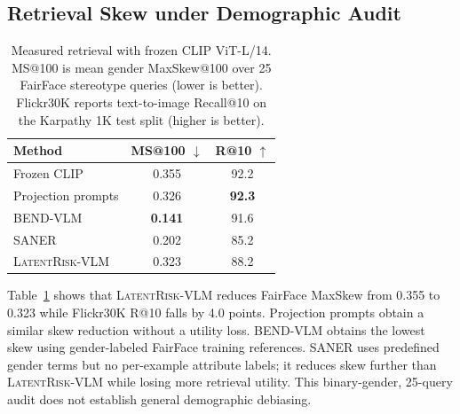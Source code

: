 \subsection{Retrieval Skew under Demographic Audit}
\begin{table}[t]
\centering
\caption{Measured retrieval with frozen CLIP ViT-L/14. MS@100 is mean gender MaxSkew@100 over 25 FairFace stereotype queries (lower is better). Flickr30K reports text-to-image Recall@10 on the Karpathy 1K test split (higher is better).}
\label{tab:retrieval}
\footnotesize
\setlength{\tabcolsep}{4pt}
\begin{tabular*}{\columnwidth}{@{\extracolsep{\fill}}lcc@{}}
\toprule
Method & MS@100 $\downarrow$ & R@10 $\uparrow$ \\
\midrule
Frozen CLIP & 0.355 & 92.2 \\
Projection prompts & 0.326 & \textbf{92.3} \\
BEND-VLM & \textbf{0.141} & 91.6 \\
SANER & 0.202 & 85.2 \\
\textsc{LatentRisk-VLM} & 0.323 & 88.2 \\
\bottomrule
\end{tabular*}
\end{table}

Table~\ref{tab:retrieval} shows that \textsc{LatentRisk-VLM} reduces FairFace MaxSkew from 0.355 to 0.323 while Flickr30K R@10 falls by 4.0 points. Projection prompts obtain a similar skew reduction without a utility loss. BEND-VLM obtains the lowest skew using gender-labeled FairFace training references. SANER uses predefined gender terms but no per-example attribute labels; it reduces skew further than \textsc{LatentRisk-VLM} while losing more retrieval utility. This binary-gender, 25-query audit does not establish general demographic debiasing.

